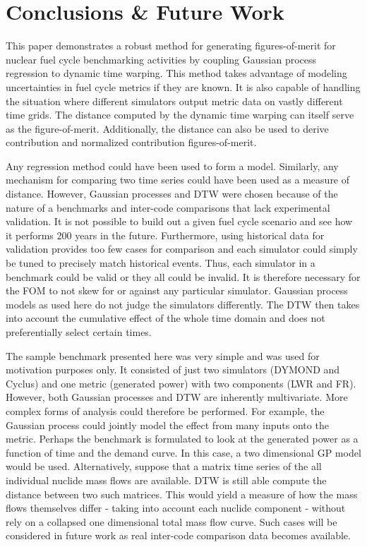 \section{Conclusions \& Future Work}
\label{conclusion}

This paper demonstrates a robust method for generating figures-of-merit
for nuclear fuel cycle benchmarking activities by coupling Gaussian process
regression to dynamic time warping. This method takes advantage of modeling
uncertainties in fuel cycle metrics if they are known. It is also capable 
of handling the situation where different simulators output metric data on
vastly different time grids. The distance computed by the dynamic time 
warping can itself serve as the figure-of-merit. Additionally, the 
distance can also be used to derive contribution and normalized contribution
figures-of-merit.

Any regression method could have been used to form a model. Similarly, any
mechanism for comparing two time series could have been used as a measure
of distance.  However, Gaussian processes and DTW were chosen because of 
the nature of a benchmarks and inter-code comparisons that lack experimental
validation. It is not possible to build out a given fuel cycle scenario
and see how it performs 200 years in the future. Furthermore, using 
historical data for validation provides too few cases for comparison and 
each simulator could simply be tuned to precisely match historical events.
Thus, each simulator in a benchmark could be valid or they all could be 
invalid. It is therefore necessary for the FOM to not skew for or against 
any particular simulator. Gaussian process models as used here do not 
judge the simulators differently. The DTW then takes into account the 
cumulative effect of the whole time domain and does not preferentially 
select certain times.

The sample benchmark presented here was very simple and was used for motivation 
purposes only. It consisted of just
two simulators (DYMOND and Cyclus) and one metric (generated power) with
two components (LWR and FR).  However, both Gaussian processes and DTW
are inherently multivariate. More complex forms of analysis could therefore
be performed. For example, the Gaussian process could jointly model the 
effect from many inputs onto the metric. Perhaps the benchmark is formulated
to look at the generated power as a function of time and the demand curve.
In this case, a two dimensional GP model would be used. Alternatively, 
suppose that a matrix time series of the all individual nuclide mass flows 
are available. DTW is still able compute the distance between two 
such matrices. This would yield a measure of how the mass flows themselves
differ - taking into account each nuclide component - without rely on a collapsed
one dimensional total mass flow curve.  Such cases will be considered in
future work as real inter-code comparison data becomes available.

